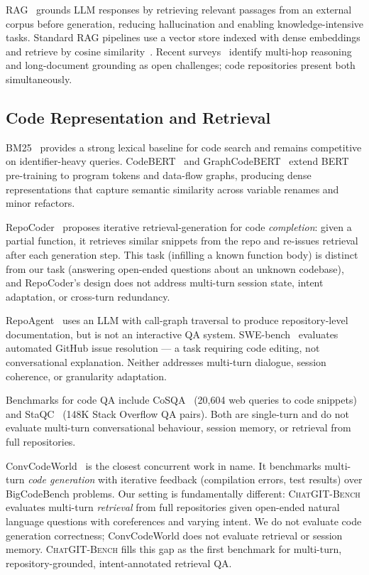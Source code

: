 \documentclass[runningheads]{llncs}
\newcommand{\conv}{\textsc{ChatGIT-Bench}\xspace}
\begin{document}
RAG~\cite{lewis2021rag} grounds LLM responses by retrieving
relevant passages from an external corpus before generation,
reducing hallucination and enabling knowledge-intensive tasks.
Standard RAG pipelines use a vector store indexed with dense
embeddings and retrieve by cosine similarity~\cite{guo2024lightrag}.
Recent surveys~\cite{petroni2024irrag,abootorabi2025multimodal}
identify multi-hop reasoning and long-document grounding as open
challenges; code repositories present both simultaneously.

\subsection{Code Representation and Retrieval}

BM25~\cite{robertson2009bm25} provides a strong lexical baseline
for code search and remains competitive on identifier-heavy queries.
CodeBERT~\cite{feng2020codebert} and
GraphCodeBERT~\cite{guo2021graphcodebert} extend BERT pre-training
to program tokens and data-flow graphs, producing dense
representations that capture semantic similarity across variable
renames and minor refactors.

RepoCoder~\cite{zhang2023repocoder} proposes iterative
retrieval-generation for code \emph{completion}: given a partial
function, it retrieves similar snippets from the repo and
re-issues retrieval after each generation step. This task
(infilling a known function body) is distinct from our task
(answering open-ended questions about an unknown codebase), and
RepoCoder's design does not address multi-turn session state,
intent adaptation, or cross-turn redundancy.

RepoAgent~\cite{liu2024repoagent} uses an LLM with call-graph
traversal to produce repository-level documentation, but is not
an interactive QA system. SWE-bench~\cite{jimenez2024swebench}
evaluates automated GitHub issue resolution --- a task requiring
code editing, not conversational explanation. Neither addresses
multi-turn dialogue, session coherence, or granularity adaptation.

Benchmarks for code QA include CoSQA~\cite{huang2021cosqa}
(20,604 web queries to code snippets) and
StaQC~\cite{yao2018staqc} (148K Stack Overflow QA pairs).
Both are single-turn and do not evaluate multi-turn conversational
behaviour, session memory, or retrieval from full repositories.

ConvCodeWorld~\cite{han2025convcodeworld} is the closest concurrent
work in name. It benchmarks multi-turn \emph{code generation}
with iterative feedback (compilation errors, test results) over
BigCodeBench problems. Our setting is fundamentally different:
\conv evaluates multi-turn \emph{retrieval} from full repositories
given open-ended natural language questions with coreferences and
varying intent. We do not evaluate code generation correctness;
ConvCodeWorld does not evaluate retrieval or session memory.
\conv fills this gap as the first benchmark for multi-turn,
repository-grounded, intent-annotated retrieval QA.
\end{document}
